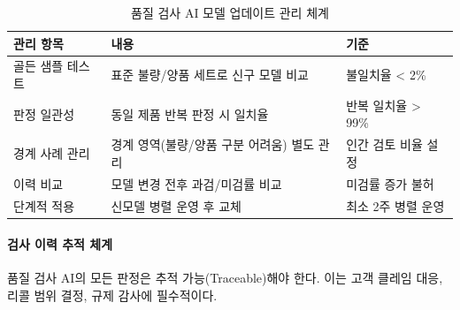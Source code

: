 \begin{table}[htbp]
\centering
\caption{품질 검사 AI 모델 업데이트 관리 체계}
\label{tab:19_model_update}
\begin{tabularx}{\textwidth}{p{3cm}Xp{3.5cm}}
\toprule
\textbf{관리 항목} & \textbf{내용} & \textbf{기준} \\
\midrule
골든 샘플 테스트 & 표준 불량/양품 세트로 신구 모델 비교 & 불일치율 < 2\% \\
판정 일관성 & 동일 제품 반복 판정 시 일치율 & 반복 일치율 > 99\% \\
경계 사례 관리 & 경계 영역(불량/양품 구분 어려움) 별도 관리 & 인간 검토 비율 설정 \\
이력 비교 & 모델 변경\cite{kreuzberger2023machine} 전후 과검/미검률 비교 & 미검률 증가 불허 \\
단계적 적용 & 신모델 병렬 운영 후 교체 & 최소 2주 병렬 운영 \\
\bottomrule
\end{tabularx}
\end{table}

\paragraph{검사 이력 추적 체계}

품질 검사 AI의 모든 판정은 추적 가능(Traceable)해야 한다. 이는 고객 클레임 대응, 리콜 범위 결정, 규제 감사에 필수적이다.

